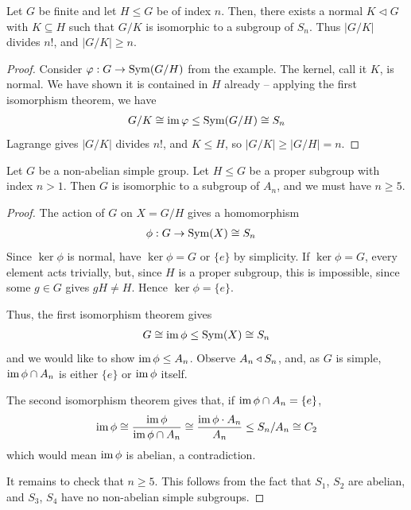 \documentclass{../../template/note}
\begin{document}
    \begin{theorem}
        Let $G$ be finite and let $H \leq G$ be of index $n$. Then, there exists a normal $K \triangleleft G$ with $K \subseteq H$ such that $G/K$ is isomorphic to a subgroup of $S_n$. Thus $|G/K|$ divides $n!$, and $|G/K| \geq n$.
    \end{theorem}
    
    \begin{proof}
        Consider $\varphi: G \to \operatorname{Sym}(G/H)$ from the example. The kernel, call it $K$, is normal. We have shown it is contained in $H$ already -- applying the first isomorphism theorem, we have
        \begin{align*}
            G/K \cong \operatorname{im} \varphi \leq \operatorname{Sym}(G/H) \cong S_n
        \end{align*}
        Lagrange gives $|G/K|$ divides $n!$, and $K \leq H$, so $|G/K| \geq |G/H| = n$.
    \end{proof}
    
    \begin{corollary}
        Let $G$ be a non-abelian simple group. Let $H \leq G$ be a proper subgroup with index $n > 1$. Then $G$ is isomorphic to a subgroup of $A_n$, and we must have $n \geq 5$.
    \end{corollary}


    \begin{proof}
        The action of $G$ on $X = G/H$ gives a homomorphism
        \begin{align*}
            \phi: G &\to \operatorname{Sym}(X) \cong S_n
        \end{align*}
        Since $\ker \phi$ is normal, have $\ker \phi = G$ or $\{e\}$ by simplicity. If $\ker \phi = G$, every element acts trivially, but, since $H$ is a proper subgroup, this is impossible, since some $g \in G$ gives $gH \neq H$. Hence $\ker \phi = \{e\}$.

        Thus, the first isomorphism theorem gives
        \begin{align*}
            G \cong \operatorname{im} \phi \leq \operatorname{Sym}(X) \cong S_n
        \end{align*}
        and we would like to show $\operatorname{im} \phi \leq A_n$. Observe $A_n \triangleleft S_n$, and, as $G$ is simple, $\operatorname{im} \phi \cap A_n$ is either $\{e\}$ or $\operatorname{im} \phi$ itself.

        The second isomorphism theorem gives that, if $\operatorname{im} \phi \cap A_n = \{e\}$,
        \begin{align*}
            \operatorname{im} \phi \cong \frac{\operatorname{im} \phi}{\operatorname{im} \phi \cap A_n} \cong \frac{\operatorname{im} \phi \cdot A_n}{A_n} \leq S_n/A_n \cong C_2
        \end{align*}
        which would mean $\operatorname{im} \phi$ is abelian, a contradiction.

        It remains to check that $n \geq 5$. This follows from the fact that $S_1$, $S_2$ are abelian, and $S_3$, $S_4$ have no non-abelian simple subgroups.
    \end{proof}
    
\end{document}
